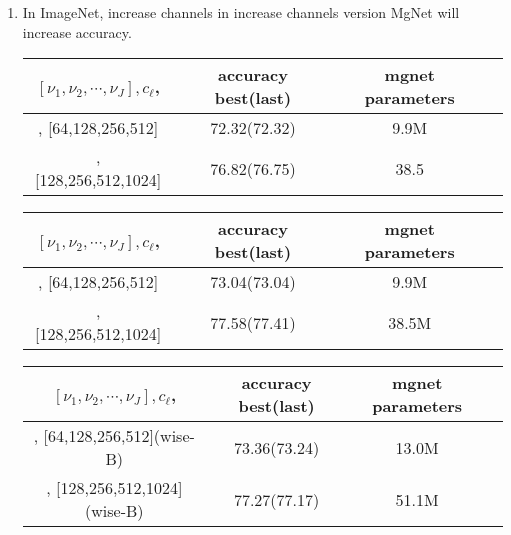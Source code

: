 \begin{enumerate}
\newpage
\item In ImageNet, increase channels in increase channels version MgNet will increase accuracy.
\begin{table}[!htbp]
	\begin{center}
			\begin{tabular}{|c|c|c|c|}
				\hline
				$[\nu_1,\nu_2,\cdots,\nu_J], c_\ell$,  &  accuracy  best(last) & mgnet parameters \tabularnewline
                \hline
				[2,2,2,2], [64,128,256,512]            &  72.32(72.32)         & 9.9M             \tabularnewline
                \hline
				[2,2,2,2], [128,256,512,1024]          &  76.82(76.75)         & 38.5             \tabularnewline
				\hline
			\end{tabular}
	\end{center}
\end{table}

\begin{table}[!htbp]
	\begin{center}
			\begin{tabular}{|c|c|c|c|}
				\hline
				$[\nu_1,\nu_2,\cdots,\nu_J], c_\ell$,  &  accuracy  best(last) & mgnet parameters \tabularnewline
                \hline
				[2,2,4,2], [64,128,256,512]            &  73.04(73.04)         & 9.9M             \tabularnewline
                \hline
				[2,2,4,2], [128,256,512,1024]          &  77.58(77.41)         & 38.5M             \tabularnewline
				\hline
			\end{tabular}
	\end{center}
\end{table}


\begin{table}[!htbp]
	\begin{center}
			\begin{tabular}{|c|c|c|c|}
				\hline
				$[\nu_1,\nu_2,\cdots,\nu_J], c_\ell$,  &  accuracy  best(last) & mgnet parameters \tabularnewline
                \hline
				[2,2,2,2], [64,128,256,512](wise-B)    &  73.36(73.24)         & 13.0M             \tabularnewline
                \hline
				[2,2,2,2], [128,256,512,1024](wise-B)  &  77.27(77.17)         & 51.1M             \tabularnewline
				\hline
			\end{tabular}
	\end{center}
\end{table}



\end{enumerate}
